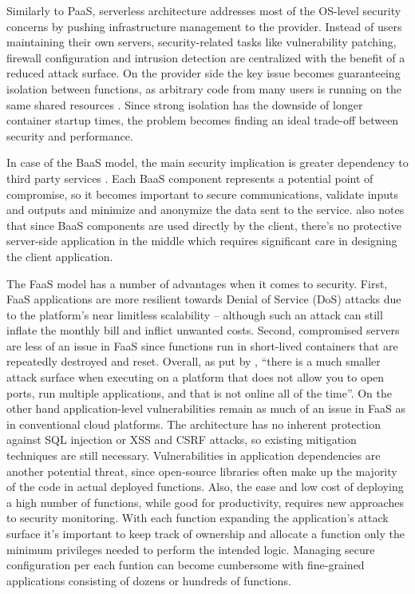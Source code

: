 Similarly to PaaS, serverless architecture addresses most of the OS-level security concerns by pushing infrastructure management to the provider. Instead of users maintaining their own servers, security-related tasks like vulnerability patching, firewall configuration and intrusion detection are centralized with the benefit of a reduced attack surface. On the provider side the key issue becomes guaranteeing isolation between functions, as arbitrary code from many users is running on the same shared resources \parencite{mcgrath17implement}. Since strong isolation has the downside of longer container startup times, the problem becomes finding an ideal trade-off between security and performance. \parencite{van2017spec}

In case of the BaaS model, the main security implication is greater dependency to third party services \parencite{segal18risks}. Each BaaS component represents a potential point of compromise, so it becomes important to secure communications, validate inputs and outputs and minimize and anonymize the data sent to the service. \textcite{robert2016serverlessarchitectures} also notes that since BaaS components are used directly by the client, there's no protective server-side application in the middle which requires significant care in designing the client application.

The FaaS model has a number of advantages when it comes to security. First, FaaS applications are more resilient towards Denial of Service (DoS) attacks due to the platform's near limitless scalability -- although such an attack can still inflate the monthly bill and inflict unwanted costs. Second, compromised servers are less of an issue in FaaS since functions run in short-lived containers that are repeatedly destroyed and reset. Overall, as put by \textcite{wagner16resilient}, ``there is a much smaller attack surface when executing on a platform that does not allow you to open ports, run multiple applications, and that is not online all of the time''. On the other hand application-level vulnerabilities remain as much of an issue in FaaS as in conventional cloud platforms. The architecture has no inherent protection against SQL injection or XSS and CSRF attacks, so existing mitigation techniques are still necessary. Vulnerabilities in application dependencies are another potential threat, since open-source libraries often make up the majority of the code in actual deployed functions. Also, the ease and low cost of deploying a high number of functions, while good for productivity, requires new approaches to security monitoring. With each function expanding the application's attack surface it's important to keep track of ownership and allocate a function only the minimum privileges needed to perform the intended logic. Managing secure configuration per each funtion can become cumbersome with fine-grained applications consisting of dozens or hundreds of functions. \parencite{podjarny17security}

